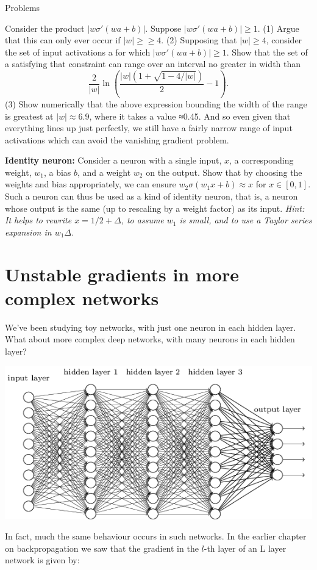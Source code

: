 \documentclass[a4paper,twoside,10pt]{book}
\begin{document}
\begin{exercize}{Problems}
\item Consider the product $|w\sigma'(wa+b)|$. Suppose $|w\sigma'(wa+b)|\geq1$. (1) Argue that this can only ever occur if $|w|≥\geq4$. (2) Supposing that $|w|\geq4$, consider the set of input activations a for which $|w\sigma'(wa+b)|\geq1$. Show that the set of a satisfying that constraint can range over an interval no greater in width than
\begin{equation}
	\frac2{|w|}\ln\left(\frac{|w|(1+\sqrt{1-4/|w|})}{2}-1\right).\label{eq:123}
\end{equation}
(3) Show numerically that the above expression bounding the width of the range is greatest at $|w|\approx6.9$, where it takes a value ≈0.45. And so even given that everything lines up just perfectly, we still have a fairly narrow range of input activations which can avoid the vanishing gradient problem.
\item \textbf{Identity neuron:} Consider a neuron with a single input, $x$, a corresponding weight, $w_1$, a bias $b$, and a weight $w_2$ on the output. Show that by choosing the weights and bias appropriately, we can ensure $w_2\sigma(w_1x+b)\approx x$ for $x\in[0,1]$. Such a neuron can thus be used as a kind of identity neuron, that is, a neuron whose output is the same (up to rescaling by a weight factor) as its input. \textit{Hint: It helps to rewrite $x=1/2+\Delta$, to assume $w_1$ is small, and to use a Taylor series expansion in $w_1\Delta$.}
\end{exercize}
\section{Unstable gradients in more complex networks}
We've been studying toy networks, with just one neuron in each hidden layer. What about more complex deep networks, with many neurons in each hidden layer?
\begin{center}
	\includegraphics[width=0.7\linewidth]{figures/ch5/tikz40}
\end{center}
In fact, much the same behaviour occurs in such networks. In the earlier chapter on backpropagation we saw that the gradient in the $l$-th layer of an L layer network is given by:
\end{document}
